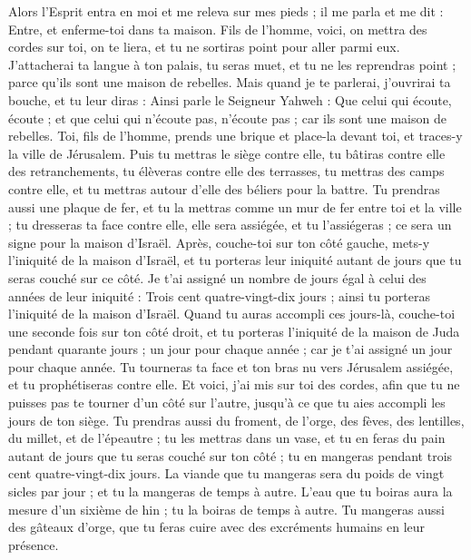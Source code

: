 \begin{multicols}{2}
Alors l'Esprit entra en moi et me releva sur mes pieds ; il me parla et me dit : Entre, et enferme-toi dans ta maison.
Fils de l’homme, voici, on mettra des cordes sur toi, on te liera, et tu ne sortiras point pour aller parmi eux.
J’attacherai ta langue à ton palais, tu seras muet, et tu ne les reprendras point ; parce qu'ils sont une maison de rebelles.
Mais quand je te parlerai, j'ouvrirai ta bouche, et tu leur diras : Ainsi parle le Seigneur Yahweh : Que celui qui écoute, écoute ; et que celui qui n'écoute pas, n'écoute pas ; car ils sont une maison de rebelles.
\VerseOne{}Toi, fils de l’homme, prends une brique et place-la devant toi, et traces-y la ville de Jérusalem.
Puis tu mettras le siège contre elle, tu bâtiras contre elle des retranchements, tu élèveras contre elle des terrasses, tu mettras des camps contre elle, et tu mettras autour d'elle des béliers pour la battre.
Tu prendras aussi une plaque de fer, et tu la mettras comme un mur de fer entre toi et la ville ; tu dresseras ta face contre elle, elle sera assiégée, et tu l'assiégeras ; ce sera un signe pour la maison d'Israël.
Après, couche-toi sur ton côté gauche, mets-y l'iniquité de la maison d'Israël, et tu porteras leur iniquité autant de jours que tu seras couché sur ce côté.
Je t'ai assigné un nombre de jours égal à celui des années de leur iniquité : Trois cent quatre-vingt-dix jours ; ainsi tu porteras l'iniquité de la maison d'Israël.
Quand tu auras accompli ces jours-là, couche-toi une seconde fois sur ton côté droit, et tu porteras l'iniquité de la maison de Juda pendant quarante jours ; un jour pour chaque année ; car je t'ai assigné un jour pour chaque année.
Tu tourneras ta face et ton bras nu vers Jérusalem assiégée, et tu prophétiseras contre elle.
Et voici, j'ai mis sur toi des cordes, afin que tu ne puisses pas te tourner d’un côté sur l'autre, jusqu'à ce que tu aies accompli les jours de ton siège.
Tu prendras aussi du froment, de l'orge, des fèves, des lentilles, du millet, et de l'épeautre ; tu les mettras dans un vase, et tu en feras du pain autant de jours que tu seras couché sur ton côté ; tu en mangeras pendant trois cent quatre-vingt-dix jours.
La viande que tu mangeras sera du poids de vingt sicles par jour ; et tu la mangeras de temps à autre.
L’eau que tu boiras aura la mesure d’un sixième de hin ; tu la boiras de temps à autre.
Tu mangeras aussi des gâteaux d'orge, que tu feras cuire avec des excréments humains en leur présence.

\end{multicols}
